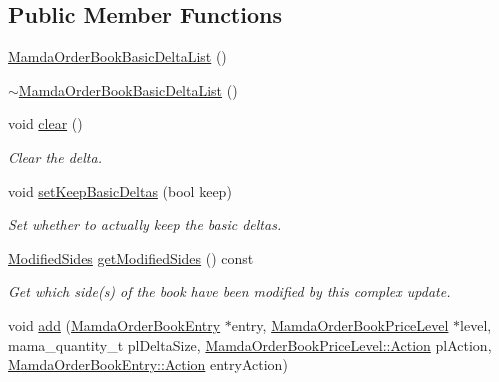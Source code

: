 \subsection*{Public Member Functions}
\begin{CompactItemize}
\item 
\hyperlink{classWombat_1_1MamdaOrderBookBasicDeltaList_a60a78d7a10f5325f02f4d9ad46375d6}{Mamda\-Order\-Book\-Basic\-Delta\-List} ()
\item 
\hyperlink{classWombat_1_1MamdaOrderBookBasicDeltaList_5e399d339b162d02183540cf1cdc0c17}{$\sim$Mamda\-Order\-Book\-Basic\-Delta\-List} ()
\item 
void \hyperlink{classWombat_1_1MamdaOrderBookBasicDeltaList_2cedbd83f82026f3c8e9b77ecc775681}{clear} ()
\begin{CompactList}\small\item\em Clear the delta. \item\end{CompactList}\item 
void \hyperlink{classWombat_1_1MamdaOrderBookBasicDeltaList_8b498ce63ea3bcc637029ad027780290}{set\-Keep\-Basic\-Deltas} (bool keep)
\begin{CompactList}\small\item\em Set whether to actually keep the basic deltas. \item\end{CompactList}\item 
\hyperlink{classWombat_1_1MamdaOrderBookBasicDeltaList_2edf0c7bea33ef46dc4071a9a4722ad1}{Modified\-Sides} \hyperlink{classWombat_1_1MamdaOrderBookBasicDeltaList_0b6da5bf442b01229a32207689da622b}{get\-Modified\-Sides} () const 
\begin{CompactList}\small\item\em Get which side(s) of the book have been modified by this complex update. \item\end{CompactList}\item 
void \hyperlink{classWombat_1_1MamdaOrderBookBasicDeltaList_6395c7929cb591aac5b91721fd11f163}{add} (\hyperlink{classWombat_1_1MamdaOrderBookEntry}{Mamda\-Order\-Book\-Entry} $\ast$entry, \hyperlink{classWombat_1_1MamdaOrderBookPriceLevel}{Mamda\-Order\-Book\-Price\-Level} $\ast$level, mama\_\-quantity\_\-t pl\-Delta\-Size, \hyperlink{classWombat_1_1MamdaOrderBookPriceLevel_bd3407b4250fc6f7a42d94b6d32e358a}{Mamda\-Order\-Book\-Price\-Level::Action} pl\-Action, \hyperlink{classWombat_1_1MamdaOrderBookEntry_fc6cb1d67c7601d093a36f59cf9bcef4}{Mamda\-Order\-Book\-Entry::Action} entry\-Action)

\end{CompactItemize}
